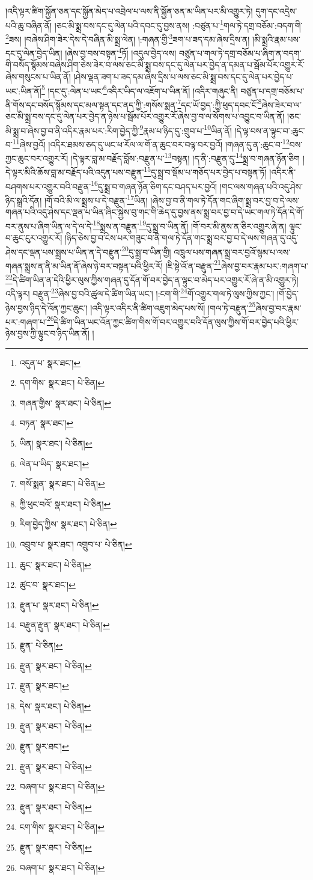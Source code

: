 །འདི་ལྟར་ཚིག་སྐྱོན་ཅན་དང་སྐྱོན་མེད་པ་འབྲེལ་པ་ལས་ནི་སྐྱོན་ཅན་མ་ཡིན་པར་མི་འགྱུར་ཏེ། དུག་དང་འདྲེས་པའི་ཆུ་བཞིན་ནོ། །ཅང་མི་སྨྲ་བས་དང་དུ་ལེན་པའི་དབང་དུ་བྱས་ནས། :བཙུན་པ་\footnote{འདུན་པ་  སྣར་ཐང་། }གལ་ཏེ་དགྲ་བཅོམ་:བདག་གི་\footnote{དག་གིས་  སྣར་ཐང་།  པེ་ཅིན། }ཟས། །བཞེས་ཤིག་ཟེར་དེས་དེ་བཞིན་མི་སྨྲ་ལེན། །:གཞན་གྱི་\footnote{གཞན་གྱིས་  སྣར་ཐང་།  པེ་ཅིན། }ཟག་པ་ཟད་དམ་ཞེས་དྲིས་ན། །མི་སྨྲའི་རྣམ་པས་དང་དུ་ལེན་བྱེད་ཡིན། །ཞེས་བྱ་བས་བསྟན་\footnote{བཏན་  སྣར་ཐང་། }ཏོ། །འདུལ་བྱེད་ལས། བཙུན་པ་གལ་ཏེ་དགྲ་བཅོམ་པ་ཞིག་ན་བདག་གི་བསོད་སྙོམས་བཞེས་ཤིག་ཅེས་ཟེར་བ་ལས་ཅང་མི་སྨྲ་བས་དང་དུ་ལེན་པར་བྱེད་ན་དམན་པ་སྦོམ་པོར་འགྱུར་རོ་ཞེས་གསུངས་པ་ཡིན་ནོ། །ཤེས་ལྡན་ཟག་པ་ཟད་དམ་ཞེས་དྲིས་པ་ལས་ཅང་མི་སྨྲ་བས་དང་དུ་ལེན་པར་བྱེད་པ་ཡང་:ཡིན་ནོ།\footnote{ཡིན།  སྣར་ཐང་།  པེ་ཅིན། } །དང་དུ་:ལེན་པ་ཡང་\footnote{ལེན་པ་ཡིད་  སྣར་ཐང་། }འདིར་ཡིད་ལ་འཇོག་པ་ཡིན་ནོ། །འདིར་གཞུང་ནི། བཙུན་པ་དགྲ་བཅོམ་པ་ནི་གོས་དང་བསོད་སྙོམས་དང་མལ་སྟན་དང་ནད་ཀྱི་:གསོས་སྨན་\footnote{གསོ་སྨན་  སྣར་ཐང་།  པེ་ཅིན། }དང་ཡོ་བྱད་:ཀྱི་ཕུད་དབང་ངོ་\footnote{ཀྱི་ཕུང་བའོ་  སྣར་ཐང་།  པེ་ཅིན། }ཞེས་ཟེར་བ་ལ་ཅང་མི་སྨྲ་བས་དང་དུ་ལེན་པར་བྱེད་ན་ཉེས་པ་སྦོམ་པོར་འགྱུར་རོ་ཞེས་བྱ་བ་ལ་སོགས་པ་འབྱུང་བ་ཡིན་ནོ། །ཅང་མི་སྨྲ་བ་ཞེས་བྱ་བ་ནི་འདིར་རྣམ་པར་:རིག་བྱེད་ཀྱི་\footnote{རིག་བྱེད་ཀྱིས་  སྣར་ཐང་།  པེ་ཅིན། }རྣམ་པ་ཉིད་དུ་:གྲུབ་པ་\footnote{འབྲུབ་པ་  སྣར་ཐང་། འགྲུབ་པ་  པེ་ཅིན། }ཡིན་ནོ། །དེ་ལྟ་བས་ན་ལྟུང་བ་:ཆུང་བ་\footnote{ཆུང་  སྣར་ཐང་།  པེ་ཅིན། }ཞེས་བྱའོ། །འདིར་ཐམས་ཅད་དུ་ཡང་ཕ་རོལ་ལ་གོ་ན་ཆུང་བར་བལྟ་བར་བྱའོ། །གཞན་དུ་ན་:ཆུང་བ་\footnote{ཚུང་བ་  སྣར་ཐང་། }བས་ཀྱང་ཆུང་བར་འགྱུར་རོ། །དེ་ལྟར་བླ་མ་བརྗོད་བློས་:བརྫུན་པ་\footnote{རྫུན་པ་  སྣར་ཐང་།  པེ་ཅིན། }བསྟན། །ད་ནི་:བརྫུན་དུ་\footnote{བརྫུན་རྫུན་  སྣར་ཐང་།  པེ་ཅིན། }སྨྲ་བ་གཞན་ཉོན་ཅིག །དེ་ལྟར་མིའི་ཆོས་བླ་མ་བརྗོད་པའི་འདུན་པས་བརྫུན་\footnote{རྫུན་  པེ་ཅིན། }དུ་སྨྲ་བ་སྡོམ་པ་གཅོད་པར་བྱེད་པ་བསྟན་ཏོ། །འདིར་ནི་བཤགས་པར་འགྱུར་བའི་བརྫུན་\footnote{རྫུན་  སྣར་ཐང་།  པེ་ཅིན། }དུ་སྨྲ་བ་གཞན་ཉོན་ཅིག་དང་བཤད་པར་བྱའོ། །གང་ལས་གཞན་པའི་འདུ་ཤེས་ཉིད་སྒྲའི་དོན། །གོ་བའི་མི་ལ་སྨྲས་པ་དེ་བརྫུན་\footnote{རྫུན་  སྣར་ཐང་། }ཡིན། །ཞེས་བྱ་བ་ནི་གལ་ཏེ་དོན་གང་ཞིག་སྨྲ་བར་བྱ་བ་དེ་ལས་གཞན་པའི་འདུ་ཤེས་དང་ལྡན་པ་ཡིན་ཞིང་སྐྱེས་བུ་གང་གི་ཆེད་དུ་བྱས་ནས་སྨྲ་བར་བྱ་བ་དེ་ཡང་གལ་ཏེ་དོན་དེ་གོ་བར་ནུས་པ་ཞིག་ཡིན་ལ་དེ་ལ་དེ་\footnote{དེས་  སྣར་ཐང་།  པེ་ཅིན། }སྨྲས་ན་བརྫུན་\footnote{རྫུན་  སྣར་ཐང་།  པེ་ཅིན། }དུ་སྨྲ་བ་ཡིན་ནོ། །གོ་བར་མི་ནུས་ན་ཅིར་འགྱུར་ཞེ་ན། ལྟུང་བ་ཆུང་ངུར་འགྱུར་རོ། །ཉིད་ཅེས་བྱ་བ་ངེས་པར་གཟུང་བ་ནི་གལ་ཏེ་དོན་གང་སྨྲ་བར་བྱ་བ་དེ་ལས་གཞན་དུ་འདུ་ཤེས་དང་ལྡན་པས་སྨྲས་པ་ཡིན་ན་དེ་བརྫུན་\footnote{རྫུན་  སྣར་ཐང་། }དུ་སྨྲ་བ་ཡིན་གྱི། འཁྲུལ་པས་གཞན་སྨྲ་བར་བྱའོ་སྙམ་པ་ལས་གཞན་སྨྲས་ན་ནི་མ་ཡིན་ནོ་ཞེས་ཉེ་བར་བསྟན་པའི་ཕྱིར་རོ། །ཇི་སྟེ་འོ་ན་བརྫུན་\footnote{རྫུན་  སྣར་ཐང་།  པེ་ཅིན། }ཞེས་བྱ་བར་རྣམ་པར་:གཞག་པ་\footnote{བཞག་པ་  སྣར་ཐང་།  པེ་ཅིན། }དེ་ཚིག་ཡིན་ན་དེའི་ཕྱིར་ལུས་ཀྱིས་གཞན་དུ་དོན་གོ་བར་བྱེད་ན་ལྟུང་བ་མེད་པར་འགྱུར་རོ་ཞེ་ན་མི་འགྱུར་ཏེ། འདི་ལྟར། བརྫུན་\footnote{རྫུན་  སྣར་ཐང་།  པེ་ཅིན། }ཞེས་བྱ་བའི་ཚུལ་དེ་ཚིག་ཡིན་ཡང་། །:ངག་གི་\footnote{ངག་གིས་  སྣར་ཐང་།  པེ་ཅིན། }གོ་འགྱུར་གལ་ཏེ་ལུས་ཀྱིས་ཀྱང་། །གོ་བྱེད་ཉེས་བྱས་ཉིད་དེ་འོན་ཀྱང་ཆུང་། །འདི་ལྟར་འདིར་ནི་ཚིག་འཇུག་མེད་པས་སོ། །གལ་ཏེ་བརྫུན་\footnote{རྫུན་  སྣར་ཐང་།  པེ་ཅིན། }ཞེས་བྱ་བར་རྣམ་པར་:གཞག་པ་\footnote{བཞག་པ་  སྣར་ཐང་།  པེ་ཅིན། }དེ་ཚིག་ཡིན་ཡང་འོན་ཀྱང་ཚིག་གིས་གོ་བར་འགྱུར་བའི་དོན་ལུས་ཀྱིས་གོ་བར་བྱེད་པའི་ཕྱིར་ཉེས་བྱས་ཀྱི་ལྟུང་བ་ཉིད་ཡིན་ནོ། །
